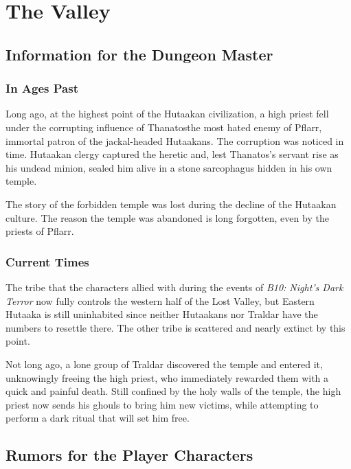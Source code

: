 \documentclass[english,11pt,openany,letterpaper,twocolumn]{book}
\begin{document}
\chapter{The Valley}
\label{ch:valley}

\section{Information for the Dungeon Master}

\subsection{In Ages Past}

Long ago, at the highest point of the Hutaakan civilization, a high priest fell under the corrupting influence of Thanatos\dash the most hated enemy of Pflarr, immortal patron of the jackal-headed Hutaakans. The corruption was noticed in time. Hutaakan clergy captured the heretic and, lest Thanatos's servant rise as his undead minion, sealed him alive in a stone sarcophagus hidden in his own temple.

\tab The story of the forbidden temple was lost during the decline of the Hutaakan culture. The reason the temple was abandoned is long forgotten, even by the priests of Pflarr.

\subsection{Current Times}

\tab The tribe that the characters allied with during the events of \emph{B10: Night's Dark Terror} now fully controls the western half of the Lost Valley, but Eastern Hutaaka is still uninhabited since neither Hutaakans nor Traldar have the numbers to resettle there. The other tribe is scattered and nearly extinct by this point.

\tab Not long ago, a lone group of Traldar discovered the temple and entered it, unknowingly freeing the high priest, who immediately rewarded them with a quick and painful death. Still confined by the holy walls of the temple, the high priest now sends his ghouls to bring him new victims, while attempting to perform a dark ritual that will set him free.

\break

\section{Rumors for the Player Characters}
\end{document}
